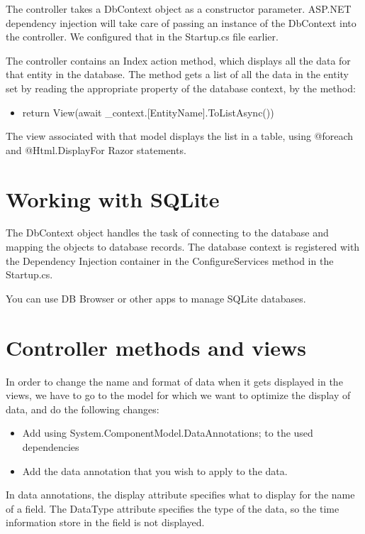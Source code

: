 \documentclass{report}
\begin{document}
    The controller takes a DbContext object as a constructor parameter.
    ASP.NET dependency injection will take care of passing an instance
    of the DbContext into the controller. We configured that in the
    Startup.cs file earlier.

    The controller contains an Index action method, which displays all
    the data for that entity in the database. The method gets a list of all
    the data in the entity set by reading the appropriate property of the
    database context, by the method:
    \begin{itemize}
        \item return View(await _context.[EntityName].ToListAsync())
    \end{itemize}

    The view associated with that model displays the list in a table,
    using @foreach and @Html.DisplayFor Razor statements.

    \chapter{Working with SQLite}
    The DbContext object handles the task of connecting to the database
    and mapping the objects to database records. The database context is
    registered with the Dependency Injection container in the ConfigureServices
    method in the Startup.cs.

    You can use DB Browser or other apps to manage SQLite databases.

    \chapter{Controller methods and views}
    In order to change the name and format of data when it gets
    displayed in the views, we have to go to the model for which we
    want to optimize the display of data, and do the following changes:
    \begin{itemize}
        \item Add using System.ComponentModel.DataAnnotations; to the used dependencies
        \item Add the data annotation that you wish to apply to the
        data.
    \end{itemize}

    In data annotations, the display attribute specifies what to display for the name
    of a field. The DataType attribute specifies the type of the data, so the time
    information store in the field is not displayed.
\end{document}
